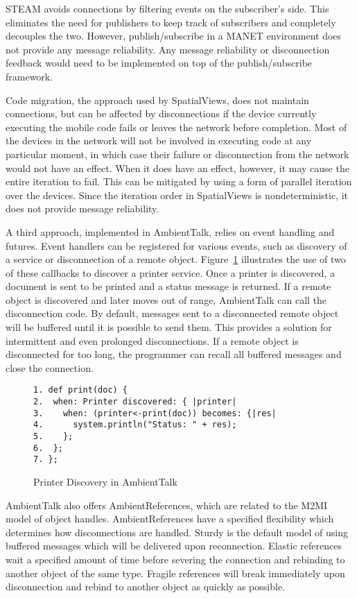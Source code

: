\documentclass{sig-alternate}
\begin{document}
STEAM avoids connections by filtering events on the subscriber's side. This eliminates the need for publishers to keep track of subscribers and completely decouples the two. However, publish/subscribe in a MANET environment does not provide any message reliability. Any message reliability or disconnection feedback would need to be implemented on top of the publish/subscribe framework.

Code migration, the approach used by SpatialViews, does not maintain connections, but can be affected by disconnections if the device currently executing the mobile code fails or leaves the network before completion.  Most of the devices in the network will not be involved in executing code at any particular moment, in which case their failure or disconnection from the network would not have an effect. When it does have an effect, however, it may cause the entire iteration to fail. This can be mitigated by using a form of parallel iteration over the devices. Since the iteration order in SpatialViews is nondeterministic, it does not provide message reliability.

A third approach, implemented in AmbientTalk, relies on event handling and futures. Event handlers can be registered for various events, such as discovery of a service or disconnection of a remote object. Figure~\ref{fig:atpd} illustrates the use of two of these callbacks to discover a printer service. Once a printer is discovered, a document is sent to be printed and a status message is returned.  If a remote object is discovered and later moves out of range, AmbientTalk can call the disconnection code. By default, messages sent to a disconnected remote object will be buffered until it is possible to send them. This provides a solution for intermittent and even prolonged disconnections. If a remote object is disconnected for too long, the programmer can recall all buffered messages and close the connection.

\begin{figure}
\centering
\begin{verbatim}
1. def print(doc) {
2.  when: Printer discovered: { |printer|
3.    when: (printer<-print(doc)) becomes: {|res|
4.      system.println("Status: " + res);
5.    };
6.  };
7. };
\end{verbatim}
\caption{Printer Discovery in AmbientTalk}
\label{fig:atpd}
\end{figure}

AmbientTalk also offers AmbientReferences\cite{ambientrefs}, which are related to the M2MI model of object handles.  AmbientReferences have a specified flexibility which determines how disconnections are handled. Sturdy is the default model of using buffered messages which will be delivered upon reconnection. Elastic references wait a specified amount of time before severing the connection and rebinding to another object of the same type. Fragile references will break immediately upon disconnection and rebind to another object as quickly as possible.
\end{document}

